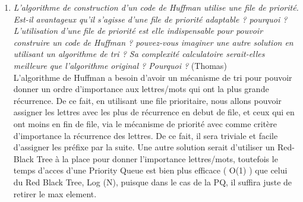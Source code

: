 \documentclass[11pt]{article}
\begin{document}
\begin{enumerate}
\item \textit{L'algorithme de construction d'un code de Huffman utilise une file de priorité. Est-il avantageux qu'il s'agisse d'une file de priorité adaptable ? pourquoi ? L'utilisation d'une file de priorité est elle indispensable pour pouvoir construire un code de Huffman ? pouvez-vous imaginer une autre solution en utilisant un algorithme de tri ? Sa complexité calculatoire serait-elles meilleure que l'algorithme original ? Pourquoi ?} (Thomas) \bigskip \\
L’algorithme de Huffman a besoin d’avoir un mécanisme de tri pour pouvoir donner un ordre d’importance aux lettres/mots qui ont la plus grande récurrence. De ce fait, en utilisant une file prioritaire, nous allons pouvoir assigner les lettres avec les plus de récurrence en debut de file, et ceux qui en ont moins en fin de file, via le mécanisme de priorité avec comme critère d’importance la récurrence des lettres. De ce fait, il sera triviale et facile d’assigner les préfixe par la suite. Une autre solution serait d’utiliser un Red-Black Tree à la place pour donner l’importance lettres/mots, toutefois le temps d’acces d’une Priority Queue est bien plus efficace ( O(1) ) que celui du Red Black Tree, Log (N), puisque dans le cas de la PQ, il suffira juste de retirer le max element.
\bigskip





\end{enumerate}
\end{document}
